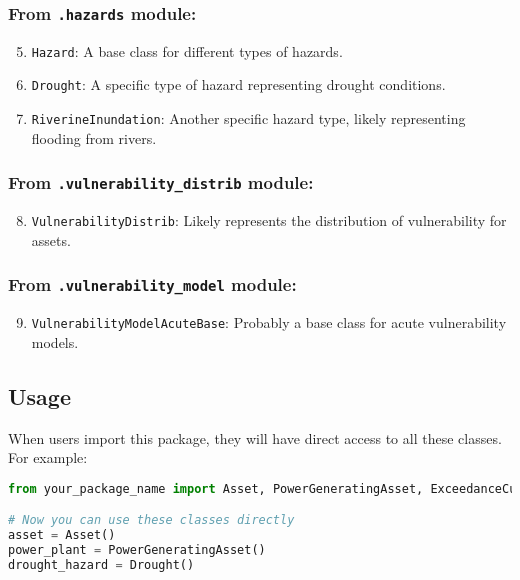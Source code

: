 \documentclass{article}
\begin{document}
\subsubsection{From \texttt{.hazards} module:}
\begin{enumerate}\setcounter{enumi}{4}
    \item \texttt{Hazard}: A base class for different types of hazards.
    \item \texttt{Drought}: A specific type of hazard representing drought conditions.
    \item \texttt{RiverineInundation}: Another specific hazard type, likely representing flooding from rivers.
\end{enumerate}

\subsubsection{From \texttt{.vulnerability\_distrib} module:}
\begin{enumerate}\setcounter{enumi}{7}
    \item \texttt{VulnerabilityDistrib}: Likely represents the distribution of vulnerability for assets.
\end{enumerate}

\subsubsection{From \texttt{.vulnerability\_model} module:}
\begin{enumerate}\setcounter{enumi}{8}
    \item \texttt{VulnerabilityModelAcuteBase}: Probably a base class for acute vulnerability models.
\end{enumerate}

\subsection{Usage}

When users import this package, they will have direct access to all these classes. For example:

\begin{lstlisting}[language=Python]
from your_package_name import Asset, PowerGeneratingAsset, ExceedanceCurve, Hazard, Drought

# Now you can use these classes directly
asset = Asset()
power_plant = PowerGeneratingAsset()
drought_hazard = Drought()
\end{lstlisting}
\end{document}
